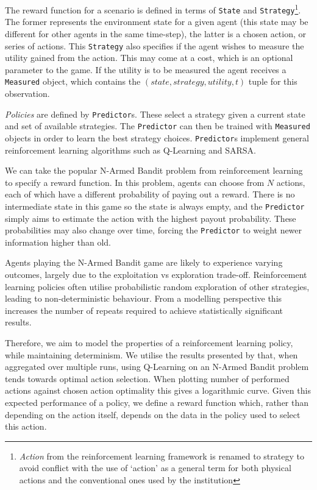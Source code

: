 The reward function for a scenario is defined in terms of \texttt{State} and
\texttt{Strategy}\footnote{\emph{Action} from the reinforcement learning
framework is renamed to strategy to avoid conflict with the use of `action' as
a general term for both physical actions and the conventional ones used by the
institution}. The former represents the environment state for a given agent
(this state may be different for other agents in the same time-step), the
latter is a chosen action, or series of actions. This \texttt{Strategy} also
specifies if the agent wishes to measure the utility gained from the action.
This may come at a cost, which is an optional parameter to the game. If the
utility is to be measured the agent receives a \texttt{Measured} object, which
contains the $(\mathit{state}, \mathit{strategy}, \mathit{utility}, t)$ tuple
for this observation.

\emph{Policies} are defined by \texttt{Predictor}s. These select a strategy
given a current state and set of available strategies. The \texttt{Predictor}
can then be trained with \texttt{Measured} objects in order to learn the best
strategy choices. \texttt{Predictor}s implement general reinforcement 
learning algorithms such as Q-Learning and SARSA.

We can take the popular N-Armed Bandit problem from reinforcement learning to
specify a reward function. In this problem, agents can choose from $N$
actions, each of which have a different probability of paying out a reward.
There is no intermediate state in this game so the state is always empty, and
the \texttt{Predictor} simply aims to estimate the action with the highest
payout probability. These probabilities may also change over time, forcing the
\texttt{Predictor} to weight newer information higher than old.

Agents playing the N-Armed Bandit game are likely to experience varying
outcomes, largely due to the exploitation vs exploration trade-off.
Reinforcement learning policies often utilise probabilistic random exploration
of other strategies, leading to non-deterministic behaviour. From a modelling
perspective this increases the number of repeats required to achieve
statistically significant results.

Therefore, we aim to model the properties of a reinforcement learning policy,
while maintaining determinism. We utilise the results presented by
\citet[ch.2]{Sutton1998} that, when aggregated over multiple runs, using
Q-Learning on an N-Armed Bandit problem tends towards optimal action
selection. When plotting number of performed actions against chosen action
optimality this gives a logarithmic curve. Given this expected performance of
a policy, we define a reward function which, rather than depending on the
action itself, depends on the data in the policy used to select this action.

